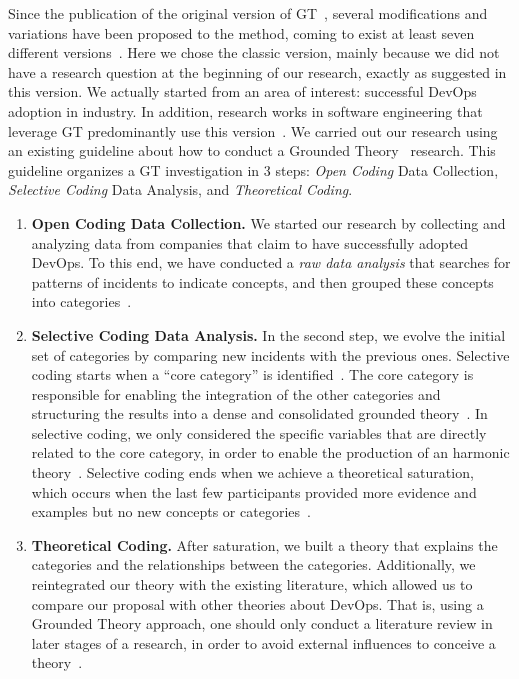 Since the publication of the original version of GT~\cite{glase1967discovery},
several modifications and variations have been proposed to the method, coming to
exist at least seven different versions~\cite{denzin2007grounded}.
Here we chose the classic version, mainly because we did not have a research
question at the beginning of our research, exactly as suggested in this
version. We actually started from an area of interest: successful DevOps adoption
in industry. In addition, research works in software engineering that leverage GT
predominantly use this version~\cite{stol2016grounded}.
We carried out our research using an existing
guideline about how to conduct a
Grounded Theory~\cite{adolph2011using} research. This guideline organizes
a GT investigation in 3 steps: \emph{Open Coding} Data Collection,
\emph{Selective Coding} Data Analysis, and \emph{Theoretical Coding}.

\begin{enumerate}[label=(\Alph*)]
\item {\bf Open Coding Data Collection.} We started our research
  by collecting and analyzing data from companies that claim to have
  successfully adopted DevOps.
  To this end, we have conducted a \emph{raw data analysis} that searches for patterns of
  incidents to indicate concepts,  and then grouped these concepts into
  categories~\cite{stol2016grounded}.

\item {\bf Selective Coding Data Analysis.} In the second step, we evolve
  the initial set of
  categories by comparing new incidents with the previous ones. Selective coding
  starts when a ``core category'' is identified~\cite{stol2016grounded}.
  The core category is responsible for enabling the integration of the other
  categories and structuring the results into a dense and consolidated grounded
  theory~\cite{jantunen2014using}. In selective coding, we only considered the
  specific variables that are directly related to the core category, in order to
  enable the production of an harmonic theory~\cite{coleman2007using,hoda2011impact}.
  Selective coding ends when we achieve a theoretical saturation, which occurs
  when the last few participants provided more evidence and examples but no new
  concepts or categories~\cite{glase1967discovery}.

\item {\bf Theoretical Coding.} After saturation, we built a theory that
explains the categories and the relationships between the categories.
Additionally, we reintegrated our theory with the existing literature, which allowed us to compare our proposal
 with other theories about DevOps. That is, using a Grounded Theory approach,
 one should only conduct a literature review in later stages of a research,
in order to avoid external influences to conceive a theory~\cite{adolph2012reconciling}.

\end{enumerate}

